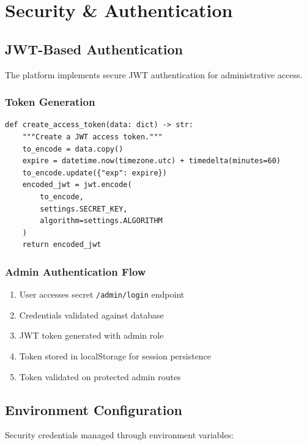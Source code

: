 \documentclass[11pt,a4paper]{article}
\begin{document}
\section{Security \& Authentication}
\label{sec:security}

\subsection{JWT-Based Authentication}

The platform implements secure JWT authentication for administrative access.

\subsubsection{Token Generation}

\begin{lstlisting}[caption=JWT Token Creation]
def create_access_token(data: dict) -> str:
    """Create a JWT access token."""
    to_encode = data.copy()
    expire = datetime.now(timezone.utc) + timedelta(minutes=60)
    to_encode.update({"exp": expire})
    encoded_jwt = jwt.encode(
        to_encode,
        settings.SECRET_KEY,
        algorithm=settings.ALGORITHM
    )
    return encoded_jwt
\end{lstlisting}

\subsubsection{Admin Authentication Flow}

\begin{enumerate}
    \item User accesses secret \texttt{/admin/login} endpoint
    \item Credentials validated against database
    \item JWT token generated with admin role
    \item Token stored in localStorage for session persistence
    \item Token validated on protected admin routes
\end{enumerate}

\subsection{Environment Configuration}

Security credentials managed through environment variables:
\end{document}
